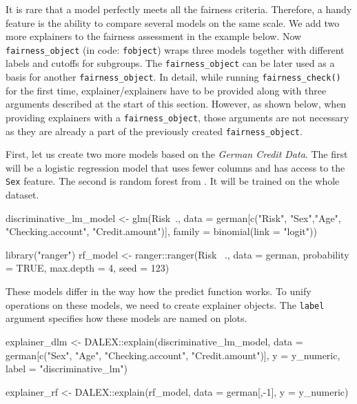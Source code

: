 It is rare that a model perfectly meets all the fairness criteria.
Therefore, a handy feature is the ability to compare several models on
the same scale. We add two more explainers to the fairness assessment in
the example below. Now \texttt{fairness\_object} (in code:
\texttt{fobject}) wraps three models together with different labels and
cutoffs for subgroups. The \texttt{fairness\_object} can be later used
as a basis for another \texttt{fairness\_object}. In detail, while
running \texttt{fairness\_check()} for the first time,
explainer/explainers have to be provided along with three arguments
described at the start of this section. However, as shown below, when
providing explainers with a \texttt{fairness\_object}, those arguments
are not necessary as they are already a part of the previously created
\texttt{fairness\_object}.

First, let us create two more models based on the \emph{German Credit
Data}. The first will be a logistic regression model that uses fewer
columns and has access to the \texttt{Sex} feature. The second is random
forest from  \citep{ranger}. It will be trained on the
whole dataset.

\begin{Schunk}
\begin{Sinput}
discriminative_lm_model <- glm(Risk~.,
         data   = german[c("Risk", "Sex","Age",
                "Checking.account", "Credit.amount")],
         family = binomial(link = "logit"))

library("ranger")
rf_model <- ranger::ranger(Risk ~.,
         data = german, probability = TRUE,
         max.depth = 4, seed = 123)
\end{Sinput}
\end{Schunk}

These models differ in the way how the predict function works. To unify
operations on these models, we need to create  explainer
objects. The \texttt{label} argument specifies how these models are
named on plots.

\begin{Schunk}
\begin{Sinput}
explainer_dlm <- DALEX::explain(discriminative_lm_model,
        data = german[c("Sex", "Age", "Checking.account", "Credit.amount")],
        y = y_numeric,
        label = "discriminative_lm") 

explainer_rf <- DALEX::explain(rf_model, 
        data = german[,-1], y = y_numeric)
\end{Sinput}
\end{Schunk}

